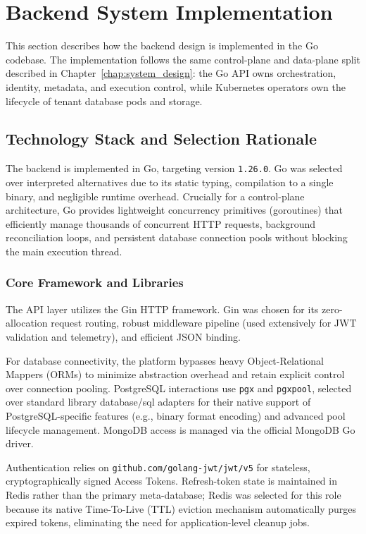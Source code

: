 \section{Backend System Implementation}

This section describes how the backend design is implemented in the Go codebase. The implementation follows the same control-plane and data-plane split described in Chapter~\ref{chap:system_design}: the Go API owns orchestration, identity, metadata, and execution control, while Kubernetes operators own the lifecycle of tenant database pods and storage.

\subsection{Technology Stack and Selection Rationale}

The backend is implemented in Go, targeting version \texttt{1.26.0}. Go was selected over interpreted alternatives due to its static typing, compilation to a single binary, and negligible runtime overhead. Crucially for a control-plane architecture, Go provides lightweight concurrency primitives (goroutines) that efficiently manage thousands of concurrent HTTP requests, background reconciliation loops, and persistent database connection pools without blocking the main execution thread.

\subsubsection{Core Framework and Libraries}
The API layer utilizes the Gin HTTP framework. Gin was chosen for its zero-allocation request routing, robust middleware pipeline (used extensively for JWT validation and telemetry), and efficient JSON binding. 

For database connectivity, the platform bypasses heavy Object-Relational Mappers (ORMs) to minimize abstraction overhead and retain explicit control over connection pooling. PostgreSQL interactions use \texttt{pgx} and \texttt{pgxpool}, selected over standard library database/sql adapters for their native support of PostgreSQL-specific features (e.g., binary format encoding) and advanced pool lifecycle management. MongoDB access is managed via the official MongoDB Go driver.

Authentication relies on \texttt{github.com/golang-jwt/jwt/v5} for stateless, cryptographically signed Access Tokens. Refresh-token state is maintained in Redis rather than the primary meta-database; Redis was selected for this role because its native Time-To-Live (TTL) eviction mechanism automatically purges expired tokens, eliminating the need for application-level cleanup jobs.

